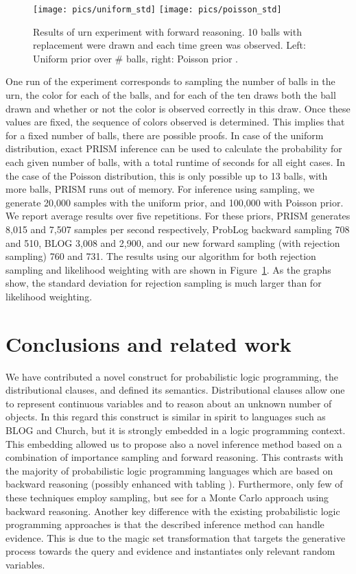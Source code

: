 \documentclass{tlp}
\begin{document}
\begin{figure}[t]
  \centering
  \texttt{[image: pics/uniform\_std]}
  \texttt{[image: pics/poisson\_std]}
  \caption{Results of urn experiment with forward reasoning. 10 balls
    with replacement were drawn and each time green was
    observed. Left: Uniform prior over \# balls, right: Poisson prior
    .}
  \label{fig:urnproblog}
\end{figure}

One run of the experiment corresponds to sampling the number  of
balls in the urn, the color for each of the  balls, and for each of
the ten draws both the ball drawn and whether or not the color is
observed correctly in this draw. Once these values are fixed, the
sequence of colors observed is determined. This implies that for a
fixed number  of balls, there are  possible
proofs.  In case of the uniform distribution, exact PRISM inference
can be used to calculate the probability for each given number of
balls, with a total runtime of  seconds for all eight cases. In
the case of the Poisson distribution, this is only possible up to 13
balls, with more balls, PRISM runs out of memory.  For inference using
sampling, we generate 20,000 samples with the uniform prior, and
100,000 with Poisson prior. We report average results over five
repetitions.  For these priors, PRISM generates 8,015 and 7,507
samples per second respectively, ProbLog backward sampling 708 and
510, BLOG 3,008 and 2,900, and our new forward sampling (with
rejection sampling) 760 and 731.  The results using our algorithm for
both rejection sampling and likelihood weighting with  are
shown in Figure~\ref{fig:urnproblog}. As the graphs show, the standard
deviation for rejection sampling is much larger than for likelihood weighting.



\section{Conclusions and related work}
\label{sec:conclusions}

We have contributed a novel construct for probabilistic logic
programming, the distributional clauses, and defined its semantics.
Distributional clauses allow one to represent continuous variables and
to reason about an unknown number of objects. In this regard this
construct is similar in spirit to languages such as BLOG and Church,
but it is strongly embedded in a logic programming context.  This
embedding allowed us to propose also a novel inference method based on
a combination of importance sampling and forward reasoning. This
contrasts with the majority of probabilistic logic programming
languages which are based on backward reasoning (possibly enhanced
with tabling \cite{SatoKameya:01,Mantadelis10iclp}).  Furthermore,
only few of these techniques employ sampling, but see \cite{Kimmig11}
for a Monte Carlo approach using backward reasoning.  Another key
difference with the existing probabilistic logic programming
approaches is that the described inference method can handle
evidence. This is due to the magic set transformation that targets the
generative process towards the query and evidence and instantiates
only relevant random variables.  
\end{document}
